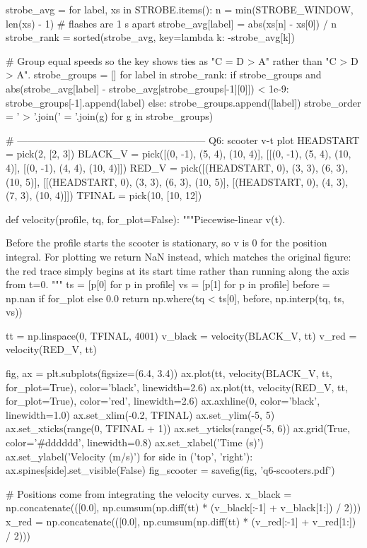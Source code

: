 \documentclass[12pt]{exam}
\begin{document}
\begin{pycode}
strobe_avg = {}
for label, xs in STROBE.items():
    n = min(STROBE_WINDOW, len(xs) - 1)      # flashes are 1 s apart
    strobe_avg[label] = abs(xs[n] - xs[0]) / n
strobe_rank = sorted(strobe_avg, key=lambda k: -strobe_avg[k])

# Group equal speeds so the key shows ties as "C = D > A" rather than "C > D > A".
strobe_groups = []
for label in strobe_rank:
    if strobe_groups and abs(strobe_avg[label] - strobe_avg[strobe_groups[-1][0]]) < 1e-9:
        strobe_groups[-1].append(label)
    else:
        strobe_groups.append([label])
strobe_order = ' > '.join(' = '.join(g) for g in strobe_groups)

# --------------------------------------------------------- Q6: scooter v-t plot
HEADSTART = pick(2, [2, 3])
BLACK_V = pick([(0, -1), (5, 4), (10, 4)],
               [[(0, -1), (5, 4), (10, 4)], [(0, -1), (4, 4), (10, 4)]])
RED_V = pick([(HEADSTART, 0), (3, 3), (6, 3), (10, 5)],
             [[(HEADSTART, 0), (3, 3), (6, 3), (10, 5)],
              [(HEADSTART, 0), (4, 3), (7, 3), (10, 4)]])
TFINAL = pick(10, [10, 12])


def velocity(profile, tq, for_plot=False):
    """Piecewise-linear v(t).

    Before the profile starts the scooter is stationary, so v is 0 for the
    position integral. For plotting we return NaN instead, which matches the
    original figure: the red trace simply begins at its start time rather than
    running along the axis from t=0.
    """
    ts = [p[0] for p in profile]
    vs = [p[1] for p in profile]
    before = np.nan if for_plot else 0.0
    return np.where(tq < ts[0], before, np.interp(tq, ts, vs))


tt = np.linspace(0, TFINAL, 4001)
v_black = velocity(BLACK_V, tt)
v_red = velocity(RED_V, tt)

fig, ax = plt.subplots(figsize=(6.4, 3.4))
ax.plot(tt, velocity(BLACK_V, tt, for_plot=True), color='black', linewidth=2.6)
ax.plot(tt, velocity(RED_V, tt, for_plot=True), color='red', linewidth=2.6)
ax.axhline(0, color='black', linewidth=1.0)
ax.set_xlim(-0.2, TFINAL)
ax.set_ylim(-5, 5)
ax.set_xticks(range(0, TFINAL + 1))
ax.set_yticks(range(-5, 6))
ax.grid(True, color='#dddddd', linewidth=0.8)
ax.set_xlabel('Time (s)')
ax.set_ylabel('Velocity (m/s)')
for side in ('top', 'right'):
    ax.spines[side].set_visible(False)
fig_scooter = savefig(fig, 'q6-scooters.pdf')

# Positions come from integrating the velocity curves.
x_black = np.concatenate(([0.0], np.cumsum(np.diff(tt) * (v_black[:-1] + v_black[1:]) / 2)))
x_red = np.concatenate(([0.0], np.cumsum(np.diff(tt) * (v_red[:-1] + v_red[1:]) / 2)))


\end{pycode}
\end{document}
